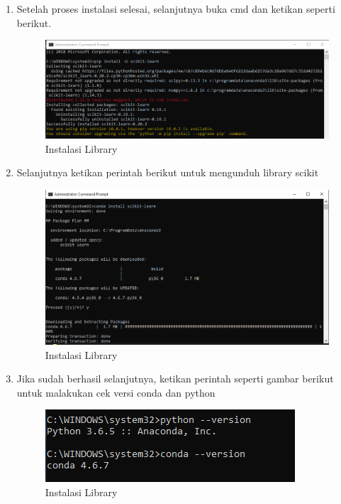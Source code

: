 \begin{enumerate}
\item Setelah proses instalasi selesai, selanjutnya buka cmd dan ketikan seperti berikut.
\begin{figure}[ht]
\centering
\includegraphics[scale=0.5]{figures/16.png}
\caption{Instalasi Library}
\end{figure}

\item Selanjutnya ketikan perintah berikut untuk mengunduh library scikit
\begin{figure}[ht]
\centering
\includegraphics[scale=0.5]{figures/17.png}
\caption{Instalasi Library}
\end{figure}

\item Jika sudah berhasil selanjutnya, ketikan perintah seperti gambar berikut untuk malakukan cek versi conda dan python
\begin{figure}[ht]
\centering
\includegraphics[scale=0.7]{figures/18.png}
\caption{Instalasi Library}
\end{figure}


\end{enumerate}
